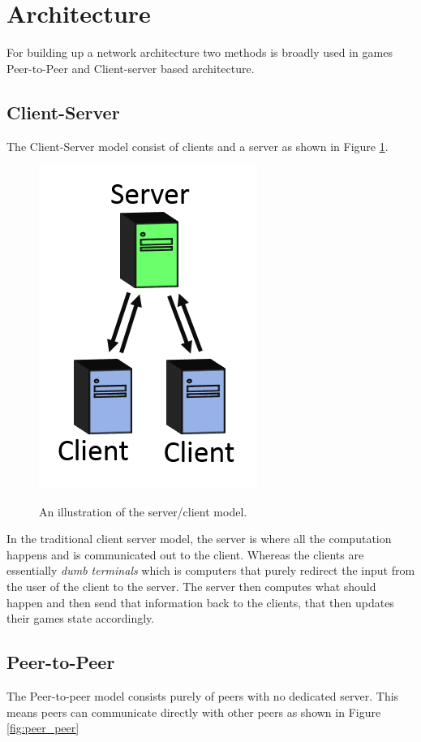 \section{Architecture}
For building up a network architecture two methods is broadly used in games Peer-to-Peer and Client-server based architecture. 


\subsection{Client-Server}
The Client-Server model consist of clients and a server as shown in Figure \ref{fig:server_client}. 

\begin{figure}[H]
\centering
\includegraphics[scale=1]{figures/network/server_client}
\label{fig:server_client}
\caption{An illustration of the server/client model.}
\end{figure}

In the traditional client server model, the server is where all the computation happens and is communicated out to the client.
Whereas the clients are essentially \textit{dumb terminals} which is computers that purely redirect the input from the user of the client to the server. 
The server then computes what should happen and then send that information back to the clients, that then updates their games state accordingly.

\subsection{Peer-to-Peer}
The Peer-to-peer model consists purely of peers with no dedicated server.
This means peers can communicate directly with other peers as shown in Figure \ref{fig:peer_peer}


